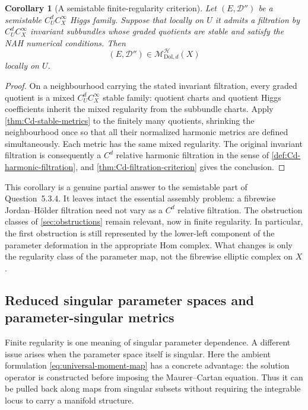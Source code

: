 \documentclass[11pt,reqno]{amsart}
\newtheorem{corollary}[theorem]{Corollary}
\theoremstyle{definition}
\theoremstyle{remark}
\newcommand{\cD}{\mathcal D}
\newcommand{\cH}{\mathcal H}
\newcommand{\Dol}{\mathrm{Dol}}
\begin{document}
\begin{corollary}[A semistable finite-regularity criterion]\label{cor:Cd-semistable-criterion}
Let $(E,\cD'')$ be a semistable $C^d_UC^\infty_X$ Higgs family.  Suppose that locally on $U$ it admits a filtration by $C^d_UC^\infty_X$ invariant subbundles whose graded quotients are stable and satisfy the NAH numerical conditions.  Then
\[
  (E,\cD'')\in\mathscr M_{\Dol,d}^{\cH}(X)
\]
locally on $U$.
\end{corollary}

\begin{proof}
On a neighbourhood carrying the stated invariant filtration, every
graded quotient is a mixed $C^d_UC^\infty_X$ stable family: quotient
charts and quotient Higgs coefficients inherit the mixed regularity
from the subbundle charts.  Apply \cref{thm:Cd-stable-metrics} to the
finitely many quotients, shrinking the neighbourhood once so that all
their normalized harmonic metrics are defined simultaneously.  Each
metric has the same mixed regularity.  The original invariant
filtration is consequently a $C^d$ relative harmonic filtration in the
sense of \cref{def:Cd-harmonic-filtration}, and
\cref{thm:Cd-filtration-criterion} gives the conclusion.
\end{proof}

This corollary is a genuine partial answer to the semistable part of Question~5.3.4.  It leaves intact the essential assembly problem: a fibrewise Jordan--H\"older filtration need not vary as a $C^d$ relative filtration.  The obstruction classes of \cref{sec:obstructions} remain relevant, now in finite regularity.  In particular, the first obstruction is still represented by the lower-left component of the parameter deformation in the appropriate Hom complex.  What changes is only the regularity class of the parameter map, not the fibrewise elliptic complex on $X$.

\subsection{Reduced singular parameter spaces and parameter-singular metrics}

Finite regularity is one meaning of singular parameter dependence.  A different issue arises when the parameter space itself is singular.  Here the ambient formulation \eqref{eq:universal-moment-map} has a concrete advantage: the solution operator is constructed before imposing the Maurer--Cartan equation.  Thus it can be pulled back along maps from singular subsets without requiring the integrable locus to carry a manifold structure.
\end{document}
